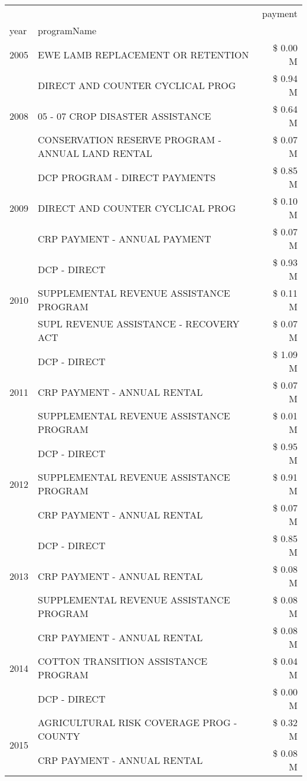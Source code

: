 \begin{tabular}{llr}
\toprule
 &  & payment \\
year & programName &  \\
\midrule
2005 & EWE LAMB REPLACEMENT OR RETENTION & \$ 0.00 M \\
\cline{1-3}
\multirow[t]{3}{*}{2008} & DIRECT AND COUNTER CYCLICAL PROG & \$ 0.94 M \\
 & 05 - 07 CROP DISASTER ASSISTANCE & \$ 0.64 M \\
 & CONSERVATION RESERVE PROGRAM - ANNUAL LAND RENTAL & \$ 0.07 M \\
\cline{1-3}
\multirow[t]{3}{*}{2009} & DCP PROGRAM - DIRECT PAYMENTS & \$ 0.85 M \\
 & DIRECT AND COUNTER CYCLICAL PROG & \$ 0.10 M \\
 & CRP PAYMENT - ANNUAL PAYMENT & \$ 0.07 M \\
\cline{1-3}
\multirow[t]{3}{*}{2010} & DCP - DIRECT & \$ 0.93 M \\
 & SUPPLEMENTAL REVENUE ASSISTANCE PROGRAM & \$ 0.11 M \\
 & SUPL REVENUE ASSISTANCE - RECOVERY ACT & \$ 0.07 M \\
\cline{1-3}
\multirow[t]{3}{*}{2011} & DCP - DIRECT & \$ 1.09 M \\
 & CRP PAYMENT - ANNUAL RENTAL & \$ 0.07 M \\
 & SUPPLEMENTAL REVENUE ASSISTANCE PROGRAM & \$ 0.01 M \\
\cline{1-3}
\multirow[t]{3}{*}{2012} & DCP - DIRECT & \$ 0.95 M \\
 & SUPPLEMENTAL REVENUE ASSISTANCE PROGRAM & \$ 0.91 M \\
 & CRP PAYMENT - ANNUAL RENTAL & \$ 0.07 M \\
\cline{1-3}
\multirow[t]{3}{*}{2013} & DCP - DIRECT & \$ 0.85 M \\
 & CRP PAYMENT - ANNUAL RENTAL & \$ 0.08 M \\
 & SUPPLEMENTAL REVENUE ASSISTANCE PROGRAM & \$ 0.08 M \\
\cline{1-3}
\multirow[t]{3}{*}{2014} & CRP PAYMENT - ANNUAL RENTAL & \$ 0.08 M \\
 & COTTON TRANSITION ASSISTANCE PROGRAM & \$ 0.04 M \\
 & DCP - DIRECT & \$ 0.00 M \\
\cline{1-3}
\multirow[t]{2}{*}{2015} & AGRICULTURAL RISK COVERAGE PROG - COUNTY & \$ 0.32 M \\
 & CRP PAYMENT - ANNUAL RENTAL & \$ 0.08 M \\

\end{tabular}

